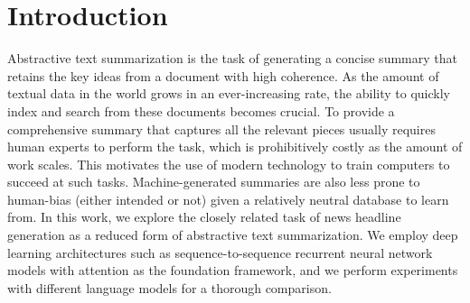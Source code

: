 \section{Introduction}

Abstractive text summarization is the task of generating a concise summary that retains the key ideas from a document with high coherence. As the amount of textual data in the world grows in an ever-increasing rate, the ability to quickly index and search from these documents becomes crucial. To provide a comprehensive summary that captures all the relevant pieces usually requires human experts to perform the task, which is prohibitively costly as the amount of work scales. This motivates the use of modern technology to train computers to succeed at such tasks. Machine-generated summaries are also less prone to human-bias (either intended or not) given a relatively neutral database to learn from. In this work, we explore the closely related task of news headline generation as a reduced form of abstractive text summarization. We employ deep learning architectures such as sequence-to-sequence recurrent neural network models with attention as the foundation framework, and we perform experiments with different language models for a thorough comparison.
